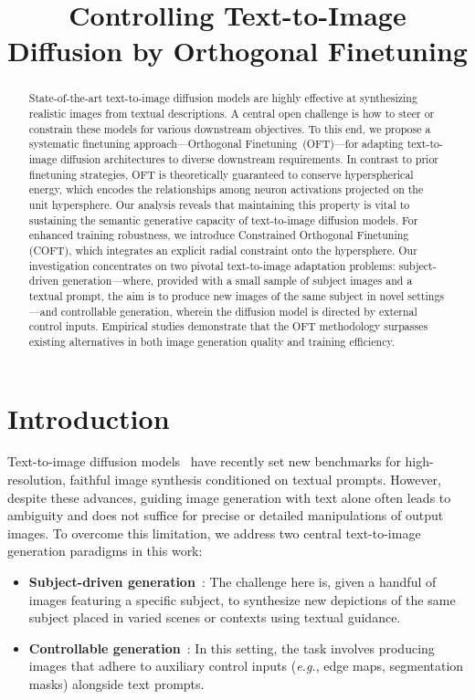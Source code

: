 \title{Controlling Text-to-Image Diffusion by Orthogonal Finetuning}

\begin{abstract}
State-of-the-art text-to-image diffusion models are highly effective at synthesizing realistic images from textual descriptions. A central open challenge is how to steer or constrain these models for various downstream objectives. To this end, we propose a systematic finetuning approach—Orthogonal Finetuning~(OFT)—for adapting text-to-image diffusion architectures to diverse downstream requirements. In contrast to prior finetuning strategies, OFT is theoretically guaranteed to conserve hyperspherical energy, which encodes the relationships among neuron activations projected on the unit hypersphere. Our analysis reveals that maintaining this property is vital to sustaining the semantic generative capacity of text-to-image diffusion models. For enhanced training robustness, we introduce Constrained Orthogonal Finetuning (COFT), which integrates an explicit radial constraint onto the hypersphere. Our investigation concentrates on two pivotal text-to-image adaptation problems: subject-driven generation—where, provided with a small sample of subject images and a textual prompt, the aim is to produce new images of the same subject in novel settings—and controllable generation, wherein the diffusion model is directed by external control inputs. Empirical studies demonstrate that the OFT methodology surpasses existing alternatives in both image generation quality and training efficiency.
\end{abstract}

\section{Introduction}

Text-to-image diffusion models~\cite{saharia2022photorealistic,ramesh2022hierarchical,rombach2022high} have recently set new benchmarks for high-resolution, faithful image synthesis conditioned on textual prompts. However, despite these advances, guiding image generation with text alone often leads to ambiguity and does not suffice for precise or detailed manipulations of output images. To overcome this limitation, we address two central text-to-image generation paradigms in this work:

\begin{itemize}[leftmargin=*,nosep]

    \item \textbf{Subject-driven generation}~\cite{ruiz2023dreambooth}: The challenge here is, given a handful of images featuring a specific subject, to synthesize new depictions of the same subject placed in varied scenes or contexts using textual guidance.
    \item \textbf{Controllable generation}~\cite{zhang2023adding,mou2023t2i}: In this setting, the task involves producing images that adhere to auxiliary control inputs (\emph{e.g.}, edge maps, segmentation masks) alongside text prompts.
\end{itemize}

